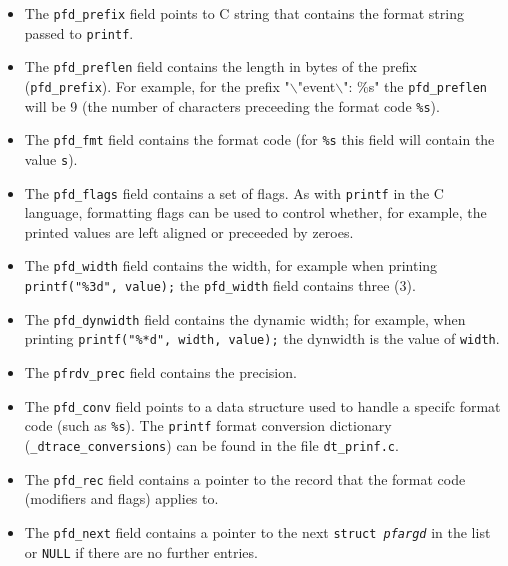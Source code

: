 \begin{itemize}

	\item The \texttt{pfd\_prefix} field points to C string that contains
the format string passed to \texttt{printf{}}.

	\item The \texttt{pfd\_preflen} field contains the length in bytes of the
prefix (\texttt{pfd\_prefix}). For example, for the prefix
"$\backslash$"event$\backslash$": \%s" the \texttt{pfd\_preflen} will be 9 (the
number of characters preceeding the format code \texttt{\%s}). 

	\item The \texttt{pfd\_fmt} field contains the format code (for
\texttt{\%s} this field will contain the value \texttt{s}).

	\item The \texttt{pfd\_flags} field contains a set of flags. As with
\texttt{printf} in the C language, formatting flags can be used to control
whether, for example, the printed values are left aligned or preceeded by
zeroes.

	\item The \texttt{pfd\_width} field contains the width, for example
when printing \texttt{printf("\%3d", value);} the \texttt{pfd\_width} field
contains three (3). 

	\item The \texttt{pfd\_dynwidth} field contains the dynamic width;
for example, when printing \texttt{printf("\%*d", width, value);} the dynwidth
is the value of \texttt{width}. 

	\item The \texttt{pfrdv\_prec} field contains the precision.

	\item The \texttt{pfd\_conv} field points to a data structure used to
handle a specifc format code (such as \texttt{\%s}). The \texttt{printf} format
conversion dictionary (\texttt{\_dtrace\_conversions}) can be found in the
file \texttt{dt\_prinf.c}.

	\item The \texttt{pfd\_rec} field contains a pointer to the record that
the format code (modifiers and flags) applies to.

	\item The \texttt{pfd\_next} field contains a pointer to the next
\texttt{struct~\textit{pfargd}} in the list or \texttt{NULL} if there are no
further entries.

\end{itemize}


